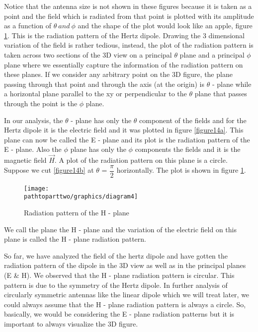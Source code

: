 Notice that the antenna size is not shown in these figures because it is taken as a point and the field which is radiated from that point is plotted with its amplitude as a function of $\theta \ and \ \phi$ and the shape of the plot would look like an apple, figure \ref{figure15}. This is the radiation pattern of the Hertz dipole. Drawing the 3 dimensional variation of the field is rather tedious, instead, the plot of the radiation pattern is taken across two sections of the 3D view on a principal $\theta$ plane and a principal $\phi$ plane where we essentially capture the information of the radiation pattern on these planes. If we consider any arbitrary point on the 3D figure, the plane passing through that point and through the axis (at the origin) is $\theta$ - plane while a horizontal plane parallel to the xy or perpendicular to the $\theta$ plane that passes through the point is the $\phi$ plane. 

In our analysis, the $\theta$ - plane has only the $\theta$ component of the fields and for the Hertz dipole it is the electric field and it was plotted in figure \ref{figure14a}. This plane can now be called the E - plane and its plot is the radiation pattern of the E - plane. Also the $\phi$ plane has only the $\phi$ components the fields and it is the magnetic field $\vec{H}$. A plot of the radiation pattern on this plane is a circle. Suppose we cut \ref{figure14b} at $\theta$ = $\dfrac{\pi}{2}$ horizontally. The plot is shown in figure \ref{figure15}.
\begin{figure}[h]
\centering
\texttt{[image: \\pathtoparttwo/graphics/diagram4]}
\caption{Radiation pattern of the H - plane}
\label{figure15}
\end{figure}

We call the plane the H - plane and the variation of the electric field on this plane is called the H - plane radiation pattern. 

So far, we have analyzed the field of the hertz dipole and have gotten the radiation pattern of the dipole in the 3D view as well as in the principal planes (E \& H). We observed that the H - plane radiation pattern is circular. This pattern is due to the symmetry of the Hertz dipole. In further analysis of circularly symmetric antennas like the linear dipole which we will treat later, we could always assume that the H - plane radiation pattern is always a circle. So, basically, we would be considering the E - plane radiation patterns but it is important to always visualize the 3D figure.

